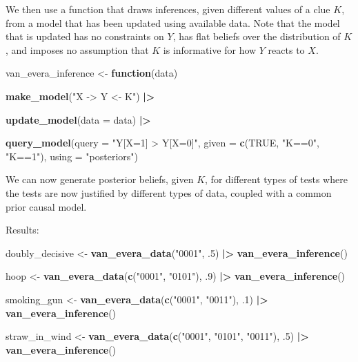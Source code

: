 \documentclass[
  12pt,
]{book}
\newenvironment{Shaded}{\begin{snugshade}}{\end{snugshade}}
\newcommand{\AttributeTok}[1]{\textcolor[rgb]{0.13,0.29,0.53}{#1}}
\newcommand{\ConstantTok}[1]{\textcolor[rgb]{0.56,0.35,0.01}{#1}}
\newcommand{\ControlFlowTok}[1]{\textcolor[rgb]{0.13,0.29,0.53}{\textbf{#1}}}
\newcommand{\DecValTok}[1]{\textcolor[rgb]{0.00,0.00,0.81}{#1}}
\newcommand{\FunctionTok}[1]{\textcolor[rgb]{0.13,0.29,0.53}{\textbf{#1}}}
\newcommand{\NormalTok}[1]{#1}
\newcommand{\OtherTok}[1]{\textcolor[rgb]{0.56,0.35,0.01}{#1}}
\newcommand{\SpecialCharTok}[1]{\textcolor[rgb]{0.81,0.36,0.00}{\textbf{#1}}}
\newcommand{\StringTok}[1]{\textcolor[rgb]{0.31,0.60,0.02}{#1}}
\begin{document}
We then use a function that draws inferences, given different values of a clue \(K\), from a model that has been updated using available data. Note that the model that is updated has no constraints on \(Y\), has flat beliefs over the distribution of \(K\), and imposes no assumption that \(K\) is informative for how \(Y\) reacts to \(X\).

\begin{Shaded}
\begin{Highlighting}[]
\NormalTok{van\_evera\_inference }\OtherTok{\textless{}{-}} \ControlFlowTok{function}\NormalTok{(data)}
  
  \FunctionTok{make\_model}\NormalTok{(}\StringTok{"X {-}\textgreater{} Y \textless{}{-} K"}\NormalTok{) }\SpecialCharTok{|\textgreater{}}
  
  \FunctionTok{update\_model}\NormalTok{(}\AttributeTok{data =}\NormalTok{ data) }\SpecialCharTok{|\textgreater{}}  
  
  \FunctionTok{query\_model}\NormalTok{(}\AttributeTok{query =} \StringTok{"Y[X=1] \textgreater{} Y[X=0]"}\NormalTok{, }
              \AttributeTok{given =} \FunctionTok{c}\NormalTok{(}\ConstantTok{TRUE}\NormalTok{, }\StringTok{"K==0"}\NormalTok{, }\StringTok{"K==1"}\NormalTok{),}
              \AttributeTok{using =} \StringTok{"posteriors"}\NormalTok{)}
\end{Highlighting}
\end{Shaded}

We can now generate posterior beliefs, given \(K\), for different types of tests where the tests are now justified by different types of data, coupled with a common prior causal model.

Results:

\begin{Shaded}
\begin{Highlighting}[]
\NormalTok{doubly\_decisive }\OtherTok{\textless{}{-}} \FunctionTok{van\_evera\_data}\NormalTok{(}\StringTok{"0001"}\NormalTok{, .}\DecValTok{5}\NormalTok{) }\SpecialCharTok{|\textgreater{}} \FunctionTok{van\_evera\_inference}\NormalTok{()}

\NormalTok{hoop            }\OtherTok{\textless{}{-}} \FunctionTok{van\_evera\_data}\NormalTok{(}\FunctionTok{c}\NormalTok{(}\StringTok{"0001"}\NormalTok{, }\StringTok{"0101"}\NormalTok{), .}\DecValTok{9}\NormalTok{) }\SpecialCharTok{|\textgreater{}} \FunctionTok{van\_evera\_inference}\NormalTok{()}

\NormalTok{smoking\_gun     }\OtherTok{\textless{}{-}} \FunctionTok{van\_evera\_data}\NormalTok{(}\FunctionTok{c}\NormalTok{(}\StringTok{"0001"}\NormalTok{, }\StringTok{"0011"}\NormalTok{), .}\DecValTok{1}\NormalTok{) }\SpecialCharTok{|\textgreater{}} \FunctionTok{van\_evera\_inference}\NormalTok{()}

\NormalTok{straw\_in\_wind   }\OtherTok{\textless{}{-}} \FunctionTok{van\_evera\_data}\NormalTok{(}\FunctionTok{c}\NormalTok{(}\StringTok{"0001"}\NormalTok{, }\StringTok{"0101"}\NormalTok{, }\StringTok{"0011"}\NormalTok{), .}\DecValTok{5}\NormalTok{) }\SpecialCharTok{|\textgreater{}} \FunctionTok{van\_evera\_inference}\NormalTok{()}
\end{Highlighting}
\end{Shaded}
\end{document}
